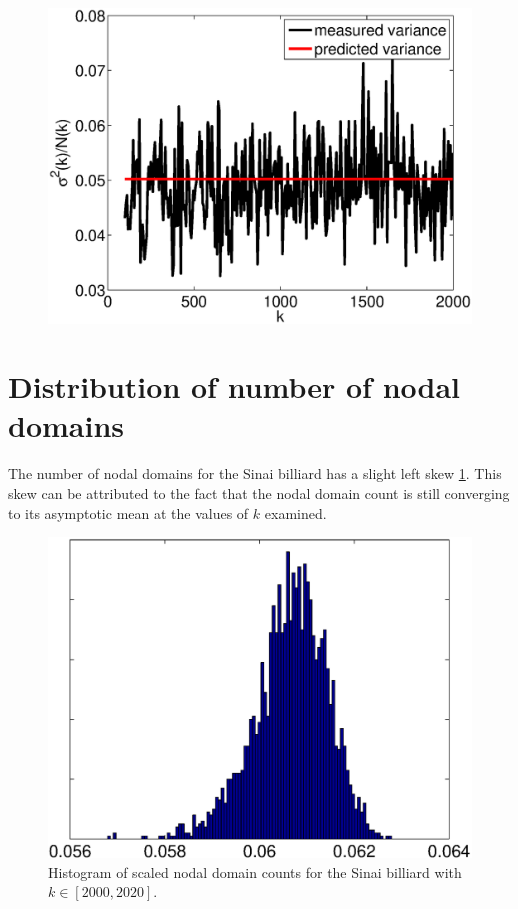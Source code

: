 \documentclass{report}
\begin{document}
\begin{figure}
  \begin{center}
    \includegraphics[width=\textwidth]{figs/results/perc_100_to_2000_variance.eps}
  \end{center}
\end{figure}

\section{Distribution of number of nodal domains}
The number of nodal domains for the Sinai billiard has a slight left skew \ref{fig:qugrs_hist}. This skew can be attributed to the fact that the nodal domain count is still converging to its asymptotic mean at the values of $k$ examined.

\begin{figure}
  \begin{center}
    \includegraphics[width=\textwidth]{figs/results/qugrs_2000_to_2020_count_histogram.eps}
    \caption{Histogram of scaled nodal domain counts for the Sinai billiard with $k \in [2000, 2020]$.}
    \label{fig:qugrs_hist}
  \end{center}
\end{figure}
\end{document}
